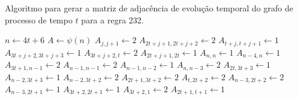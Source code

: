 \documentclass[12pt,a4paper]{article}
\begin{document}
\begin{algorithm}[H]
\caption{Algoritmo para gerar a matriz de adjacência de evolução temporal do
grafo de processo de tempo $t$ para a regra 232.}
\label{alg:r232}
\begin{algorithmic}
\STATE $n \leftarrow 4t+6$
\STATE $A \leftarrow \psi(n)$
        \STATE $A_{j,j+1} \leftarrow 2$
        \STATE $A_{2t+j+1,2t+j+2} \leftarrow 2$
        \STATE $A_{t+j,t+j+1} \leftarrow 1$
        \STATE $A_{3t+j+2,3t+j+3} \leftarrow 1$
    \ENDFOR
\ENDIF
{}
    \STATE $A_{3t+j+2,t} \leftarrow 2$
    \STATE $A_{2t+j+1,2t} \leftarrow 1$
\ENDFOR
\STATE $A_{n,n} \leftarrow 1$
\STATE $A_{n-4,n} \leftarrow 1$
\STATE $A_{3t+1,n-1} \leftarrow 2$
\STATE $A_{n-1,n-1} \leftarrow 2$
\STATE $A_{n-1,n-2} \leftarrow 1$
\STATE $A_{n,n-3} \leftarrow 2$
\STATE $A_{2t,3t+3} \leftarrow 1$
\STATE $A_{n-2,3t+3} \leftarrow 1$
\STATE $A_{n-2,3t+2} \leftarrow 2$
\STATE $A_{2t+1,3t+2} \leftarrow 2$
\STATE $A_{t,2t+2} \leftarrow 2$
\STATE $A_{n-3,2t+2} \leftarrow 2$
\STATE $A_{n-3,2t+1} \leftarrow 1$
\STATE $A_{3t+2,2t+1} \leftarrow 1$
\STATE $A_{3t+2,1} \leftarrow 2$
\STATE $A_{2t+1,t+1} \leftarrow 1$
\end{algorithmic}
\end{algorithm}

\newpage
\end{document}
